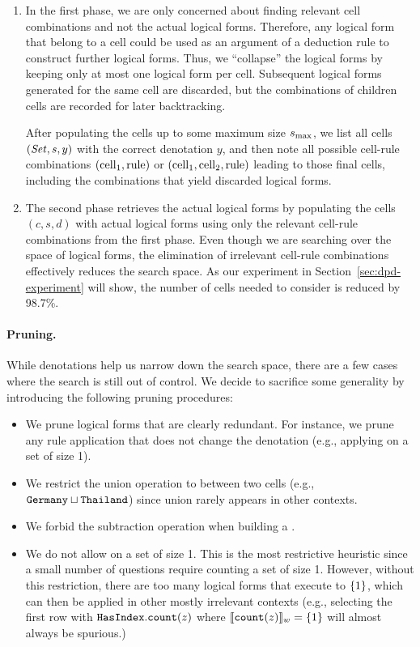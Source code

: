 \begin{enumerate}
\item 
In the first phase,
we are only concerned about finding relevant cell combinations
and not the actual logical forms.
Therefore, any logical form that belong to a cell
could be used as an argument
of a deduction rule to construct further logical forms.
Thus, we ``collapse'' the logical forms
by keeping only at most one logical form per cell.
Subsequent logical forms generated for the same cell
are discarded,
but the combinations of children cells are recorded
for later backtracking.

After populating the cells up to some maximum size $s_\mathrm{max}$,
we list all cells $(\text{\emph{Set}}, s, y)$
with the correct denotation $y$,
and then note all possible cell-rule combinations
$(\mathrm{cell}_1, \mathrm{rule})$
or $(\mathrm{cell}_1, \mathrm{cell}_2, \mathrm{rule})$
leading to those final cells,
including the combinations that yield discarded logical forms.

\item
The second phase retrieves the actual logical forms
by populating the cells $(c, s, d)$ with actual logical forms
using only the relevant cell-rule combinations
from the first phase.
Even though we are searching over the space of logical forms,
the elimination of irrelevant cell-rule combinations
effectively reduces the search space.
As our experiment in Section~\ref{sec:dpd-experiment} will show,
the number of cells needed to consider
is reduced by 98.7\%.
\end{enumerate}

\paragraph{Pruning.}
While denotations help us narrow down the search space,
there are a few cases where the search is still out of control.
We decide to sacrifice some generality
by introducing the following pruning procedures:

\begin{itemize}
\item We prune logical forms that are clearly redundant.
For instance, we prune any rule application that
does not change the denotation
(e.g., applying  on a set of size 1).
\item We restrict the union operation to between two cells
(e.g., $\texttt{Germany} \sqcup \texttt{Thailand}$)
since union rarely appears in other contexts.
\item We forbid the subtraction operation
when building a .
\item We do not allow  on a set of size 1.
This is the most restrictive heuristic since a small number
of questions require counting a set of size 1.
However, without this restriction, there are too many
logical forms that execute to $\left\{ 1 \right\}$,
which can then be applied in other mostly irrelevant contexts
(e.g.,
selecting the first row with
$\texttt{Has}{\texttt{Index}}.\texttt{count}(z)$
where $\llbracket{\texttt{count}(z)}\rrbracket_{w} = \left\{ 1 \right\}$
will almost always be spurious.)
\end{itemize}

